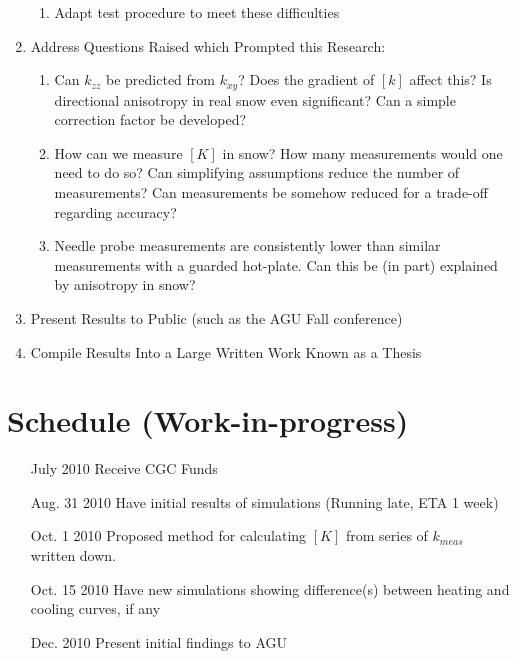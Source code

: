 \documentclass[10pt, letterpaper]{article}
\begin{document}
\begin{enumerate}
\begin{enumerate}
            \item Adapt test procedure to meet these difficulties
        \end{enumerate}
        \item Address Questions Raised which Prompted this Research:
        \begin{enumerate}
            \item Can \(k_{zz}\) be predicted from \(k_{xy}\)? Does the gradient of \([k]\) affect this? Is directional anisotropy in real snow even significant? Can a simple correction factor be developed?
            \item How can we measure \([K]\) in snow? How many measurements would one need to do so? Can simplifying assumptions reduce the number of measurements? Can measurements be somehow reduced for a trade-off regarding accuracy?
            \item Needle probe measurements are consistently lower than similar measurements with a guarded hot-plate. Can this be (in part) explained by anisotropy in snow?
        \end{enumerate}
        \item Present Results to Public (such as the AGU Fall conference)
        \item Compile Results Into a Large Written Work Known as a Thesis
    \end{enumerate}

    \section{Schedule (Work-in-progress)}

    \begin{itemize}
        \item[July 2010] Receive CGC Funds \checkmark
        \item[Aug. 31 2010] Have initial results of simulations (Running late, ETA 1 week)
        \item[Oct. 1 2010] Proposed method for calculating \([K]\) from series of \(k_{meas}\) written down.
        \item[Oct. 15 2010] Have new simulations showing difference(s) between heating and cooling curves, if any
        \item[Dec. 2010] Present initial findings to AGU
    \end{itemize}
\end{document}
